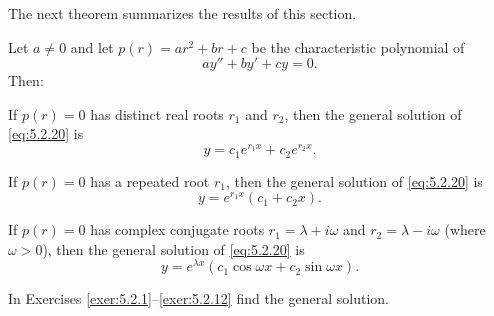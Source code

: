 
\noindent
The next theorem summarizes the results of this section.

\begin{theorem}
  \color{blue}
  \label{thmtype:5.2.1} Let $a\ne0$ and let $p(r)=ar^{2}+br+c$ be the characteristic polynomial of
  \begin{equation}
    \label{eq:5.2.20}ay''+by'+cy=0.
  \end{equation}
  Then:
  \begin{alist}
    \item %
    If $p(r)=0$ has distinct real roots $r_{1}$ and $r_{2}$, then the general solution of
    \eqref{eq:5.2.20} is
    \[
      y=c_{1}e^{r_{1}x}+c_{2}e^{r_{2}x}.
    \]

    \item %
    If $p(r)=0$ has a repeated root $r_{1}$, then the general solution of \eqref{eq:5.2.20} is
    \[
      y=e^{r_{1}x}(c_{1}+c_{2}x).
    \]

    \item %
    If $p(r)=0$ has complex conjugate roots $r_{1}=\lambda+i\omega$ and $r_{2}=\lambda-i\omega$
    (where $\omega>0$), then the general solution of \eqref{eq:5.2.20} is
    \[
      y=e^{\lambda x}(c_{1}\cos\omega x+c_{2}\sin\omega x).
    \]
  \end{alist}
\end{theorem}

\exercises In Exercises \ref{exer:5.2.1}--\ref{exer:5.2.12} find the general solution.

